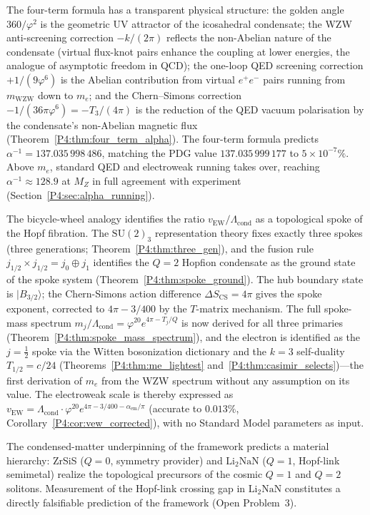 \documentclass[11pt,a4paper]{article}
\theoremstyle{definition}
\theoremstyle{remark}
\newcommand{\vp}{\varphi}
\newcommand{\vEW}{v_{\mathrm{EW}}}
\newcommand{\aInv}{\alpha^{-1}}
\newcommand{\aem}{\alpha_{\mathrm{em}}}
\newcommand{\Lcond}{\Lambda_{\mathrm{cond}}}
\newcommand{\mWZW}{m_{\mathrm{WZW}}}
\begin{document}
The four-term formula has a transparent physical structure: the golden angle
$360/\vp^2$ is the geometric UV attractor of the icosahedral condensate; the
WZW anti-screening correction $-k/(2\pi)$ reflects the non-Abelian nature of
the condensate (virtual flux-knot pairs enhance the coupling at lower
energies, the analogue of asymptotic freedom in QCD); the one-loop QED
screening correction $+1/(9\vp^6)$ is the Abelian contribution from virtual
$e^+e^-$ pairs running from $\mWZW$ down to $m_e$; and the Chern--Simons
correction $-1/(36\pi\vp^6) = -T_3/(4\pi)$ is the reduction of the QED
vacuum polarisation by the condensate's non-Abelian magnetic flux
(Theorem~\ref{P4:thm:four_term_alpha}).  The four-term formula
predicts $\aInv = 137.035\,998\,486$, matching the PDG value $137.035\,999\,177$
to $5\times10^{-7}\%$.  Above $m_e$, standard QED and electroweak running
takes over, reaching $\aInv\approx128.9$ at $M_Z$ in full agreement with
experiment (Section~\ref{P4:sec:alpha_running}).

The bicycle-wheel analogy identifies the ratio $\vEW/\Lcond$ as
a topological spoke of the Hopf fibration.  The $\mathrm{SU}(2)_3$
representation theory fixes exactly three spokes (three generations;
Theorem~\ref{P4:thm:three_gen}), and the fusion rule
$j_{1/2}\times j_{1/2}=j_0\oplus j_1$ identifies the $Q=2$ Hopfion
condensate as the ground state of the spoke system (Theorem~\ref{P4:thm:spoke_ground}).
The hub boundary state is $|B_{3/2}\rangle$; the Chern-Simons action difference
$\Delta S_\mathrm{CS} = 4\pi$ gives the spoke exponent, corrected to
$4\pi-3/400$ by the $T$-matrix mechanism.
The full spoke-mass spectrum $m_j/\Lcond = \vp^{20}e^{4\pi-T_j/Q}$ is
now derived for all three primaries (Theorem~\ref{P4:thm:spoke_mass_spectrum}),
and the electron is identified as the $j=\tfrac{1}{2}$ spoke via the Witten
bosonization dictionary and the $k=3$ self-duality $T_{1/2}=c/24$
(Theorems~\ref{P4:thm:me_lightest} and~\ref{P4:thm:casimir_selects})---the first
derivation of $m_e$ from the WZW spectrum without any assumption on its value.
The electroweak scale is thereby
expressed as $\vEW = \Lcond\cdot\vp^{20}e^{4\pi-3/400-\aem/\pi}$ (accurate
to $0.013\%$, Corollary~\ref{P4:cor:vew_corrected}), with no Standard Model
parameters as input.

The condensed-matter underpinning of the framework predicts a material
hierarchy: ZrSiS ($Q=0$, symmetry provider) and $\mathrm{Li_2NaN}$
($Q=1$, Hopf-link semimetal) realize the topological precursors of the
cosmic $Q=1$ and $Q=2$ solitons.  Measurement of the Hopf-link crossing
gap in $\mathrm{Li_2NaN}$ constitutes a directly falsifiable prediction
of the framework (Open Problem~3).
\end{document}
